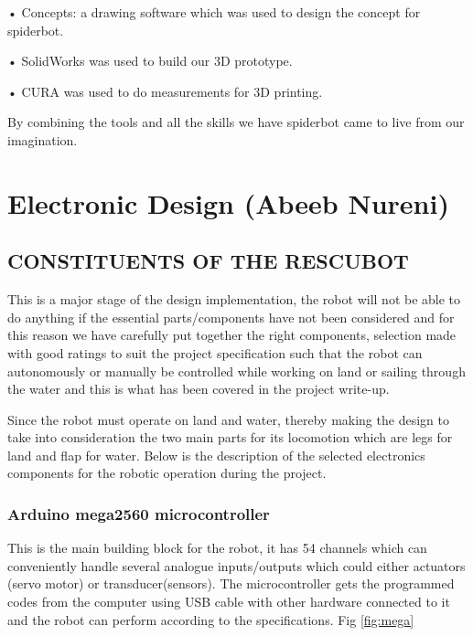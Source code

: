 \documentclass[10pt,journal,compsoc]{IEEEtran}
\begin{document}
•	Concepts: a drawing software which was used to design the concept for spiderbot.

•	SolidWorks was used to build our 3D prototype.

•	CURA was used to do measurements for 3D printing.

By combining the tools and all the skills we have spiderbot came to live from our imagination.
 

\section{Electronic Design (Abeeb Nureni)}

\subsection{CONSTITUENTS OF THE RESCUBOT}

This is a major stage of the design implementation, the robot will not be able to do anything if the essential parts/components have not been considered and for this reason we have carefully put together the right components, selection made with good ratings to suit the project specification such that the robot can autonomously or manually be controlled while working on land or sailing through the water and this is what has been covered in the project write-up.

Since the robot must operate on land and water, thereby making the design to take into consideration the two main parts for its locomotion which are legs for land and flap for water. Below is the description of the selected electronics components for the robotic operation during the project.

\subsubsection{Arduino mega2560 microcontroller}

This is the main building block for the robot, it has 54 channels which can conveniently handle several analogue inputs/outputs which could either actuators (servo motor) or transducer(sensors). The microcontroller gets the programmed codes from the computer using USB cable with other hardware connected to it and the robot can perform according to the specifications. \cite{mega} Fig \ref{fig:mega}
\end{document}
